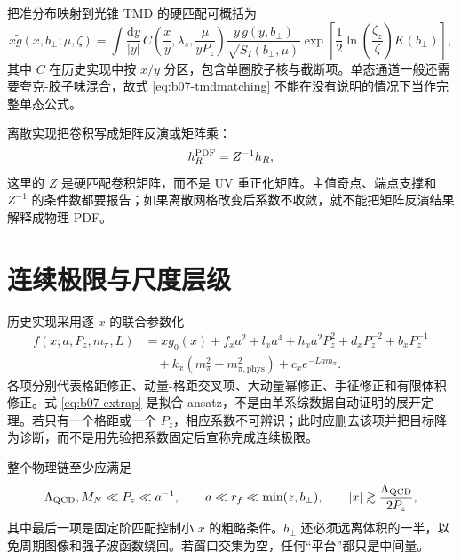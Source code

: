 把准分布映射到光锥 TMD 的硬匹配可概括为
\begin{equation}
  x\tilde g(x,b_\perp;\mu,\zeta)
  =\int\frac{\mathrm dy}{|y|}\,
  C\!\left(\frac xy,\lambda_s,\frac{\mu}{yP_z}\right)
  \frac{y\,g(y,b_\perp)}{\sqrt{S_I(b_\perp,\mu)}}
  \exp\!\left[
  \frac12\ln\!\left(\frac{\zeta_z}{\zeta}\right)K(b_\perp)
  \right],
  \label{eq:b07-tmdmatching}
\end{equation}
其中 $C$ 在历史实现中按 $x/y$ 分区，包含单圈胶子核与截断项。单态通道一般还需要夸克-胶子味混合，故式 \eqref{eq:b07-tmdmatching} 不能在没有说明的情况下当作完整单态公式。

离散实现把卷积写成矩阵反演或矩阵乘：
\begin{equation}
  h_R^{\rm PDF}=Z^{-1}h_R,
  \label{eq:b07-zmatrix}
\end{equation}
这里的 $Z$ 是硬匹配卷积矩阵，而不是 UV 重正化矩阵。主值奇点、端点支撑和 $Z^{-1}$ 的条件数都要报告；如果离散网格改变后系数不收敛，就不能把矩阵反演结果解释成物理 PDF。

\section{连续极限与尺度层级}

历史实现采用逐 $x$ 的联合参数化
\begin{align}
  f(x;a,P_z,m_\pi,L)
  &=xg_0(x)+f_xa^2+l_xa^4+h_xa^2P_z^2
  +d_xP_z^{-2}+b_xP_z^{-1}\nonumber\\
  &\quad +k_x(m_\pi^2-m_{\pi,\mathrm{phys}}^2)
  +c_xe^{-La m_\pi}.
  \label{eq:b07-extrap}
\end{align}
各项分别代表格距修正、动量-格距交叉项、大动量幂修正、手征修正和有限体积修正。式 \eqref{eq:b07-extrap} 是拟合 ansatz，不是由单系综数据自动证明的展开定理。若只有一个格距或一个 $P_z$，相应系数不可辨识；此时应删去该项并把目标降为诊断，而不是用先验把系数固定后宣称完成连续极限。

整个物理链至少应满足
\begin{equation}
  \Lambda_{\rm QCD},M_N\ll P_z\ll a^{-1},
  \qquad
  a\ll r_f\ll \min(z,b_\perp),
  \qquad
  |x|\gtrsim \frac{\Lambda_{\rm QCD}}{2P_z},
  \label{eq:b07-windows}
\end{equation}
其中最后一项是固定阶匹配控制小 $x$ 的粗略条件。$b_\perp$ 还必须远离体积的一半，以免周期图像和强子波函数绕回。若窗口交集为空，任何“平台”都只是中间量。

